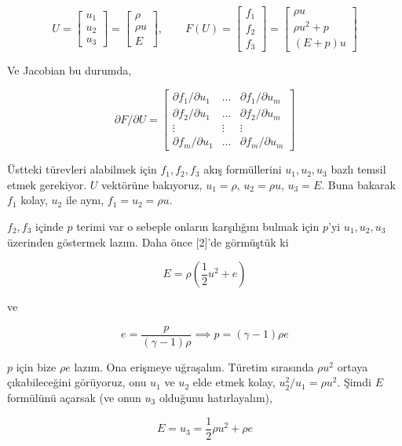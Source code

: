 \documentclass[12pt,fleqn]{article}\usepackage{../../common}
\begin{document}
$$
U =
\left[\begin{array}{c}
u_1 \\ u_2  \\ u_3
\end{array}\right] = 
\left[\begin{array}{c}
\rho \\ \rho u  \\ E
\end{array}\right], \qquad
F(U) =
\left[\begin{array}{c}
f_1 \\ f_2  \\ f_3
\end{array}\right] = 
\left[\begin{array}{c}
\rho u \\ \rho u^2 + p \\ (E+p) u 
\end{array}\right]
$$

Ve Jacobian bu durumda,

$$
\partial F / \partial U =
\left[\begin{array}{ccc}
\partial f_1 / \partial u_1 & \dots & \partial f_1 / \partial u_m \\
\partial f_2 / \partial u_1 & \dots & \partial f_2 / \partial u_m \\
\vdots & \vdots & \vdots \\
\partial f_m / \partial u_1 & \dots & \partial f_m / \partial u_m 
\end{array}\right]
$$

Üstteki türevleri alabilmek için $f_1,f_2,f_3$ akış formüllerini $u_1,u_2,u_3$
bazlı temsil etmek gerekiyor. $U$ vektörüne bakıyoruz, $u_1 = \rho$,
$u_2 = \rho u$, $u_3 = E$. Buna bakarak $f_1$ kolay, $u_2$ ile aynı,
$f_1 = u_2 = \rho u$.

$f_2,f_3$ içinde $p$ terimi var o sebeple onların karşılığını bulmak için
$p$'yi $u_1,u_2,u_3$ üzerinden göstermek lazım. Daha önce [2]'de görmüştük ki

$$
E = \rho (\frac{1}{2} u^2 + e)
$$

ve

$$
e = \frac{p}{(\gamma - 1)\rho} \implies p = (\gamma - 1) \rho e
$$

$p$ için bize $\rho e$ lazım. Ona erişmeye uğraşalım. Türetim sırasında $\rho
u^2$ ortaya çıkabileceğini görüyoruz, onu $u_1$ ve $u_2$ elde etmek kolay,
$u_2^2 / u_1 = \rho u^2$. Şimdi $E$ formülünü açarsak (ve onun $u_3$ olduğunu
hatırlayalım),

$$
E = u_3 = \frac{1}{2} \rho u^2 + \rho e
$$
\end{document}
